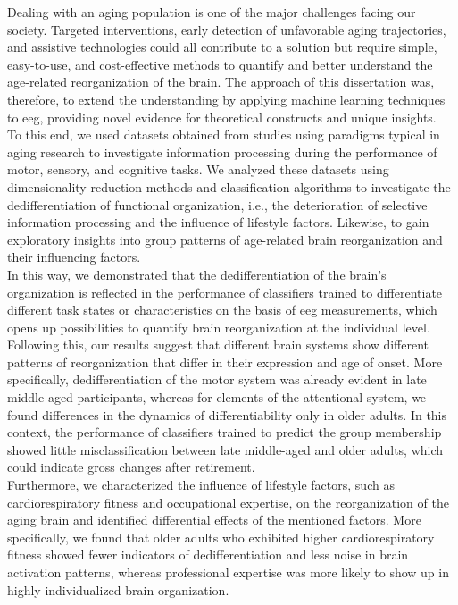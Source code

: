 Dealing with an aging population is one of the major challenges facing our society. Targeted interventions, early detection of unfavorable aging trajectories, and assistive technologies could all contribute to a solution but require simple, easy-to-use, and cost-effective methods to quantify and better understand the age-related reorganization of the brain. The approach of this dissertation was, therefore, to extend the understanding by applying machine learning techniques to \gls{eeg}, providing novel evidence for theoretical constructs and unique insights.\\
To this end, we used datasets obtained from studies using paradigms typical in aging research to investigate information processing during the performance of motor, sensory, and cognitive tasks. We analyzed these datasets using dimensionality reduction methods and classification algorithms to investigate the dedifferentiation of functional organization, i.e., the deterioration of selective information processing and the influence of lifestyle factors. Likewise, to gain exploratory insights into group patterns of age-related brain reorganization and their influencing factors.\\
In this way, we demonstrated that the dedifferentiation of the brain's organization is reflected in the performance of classifiers trained to differentiate different task states or characteristics on the basis of \gls{eeg} measurements, which opens up possibilities to quantify brain reorganization at the individual level. Following this, our results suggest that different brain systems show different patterns of reorganization that differ in their expression and age of onset. More specifically, dedifferentiation of the motor system was already evident in late middle-aged participants, whereas for elements of the attentional system, we found differences in the dynamics of differentiability only in older adults. In this context, the performance of classifiers trained to predict the group membership showed little misclassification between late middle-aged and older adults, which could indicate gross changes after retirement.\\
Furthermore, we characterized the influence of lifestyle factors, such as cardiorespiratory fitness and occupational expertise, on the reorganization of the aging brain and identified differential effects of the mentioned factors. More specifically, we found that older adults who exhibited higher cardiorespiratory fitness showed fewer indicators of dedifferentiation and less noise in brain activation patterns, whereas professional expertise was more likely to show up in highly individualized brain organization.\\
